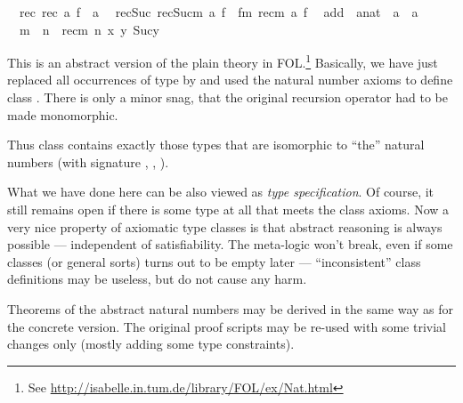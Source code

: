 \begin{isabellebody}
\ \ rec{\isacharunderscore}{}{\isacharcolon}\ {\isachardoublequoteopen}rec{\isacharparenleft}{\isasymzero}{\isacharcomma}\ a{\isacharcomma}\ f{\isacharparenright}\ {\isacharequal}\ a{\isachardoublequoteclose}\isanewline
\ \ rec{\isacharunderscore}Suc{\isacharcolon}\ {\isachardoublequoteopen}rec{\isacharparenleft}Suc{\isacharparenleft}m{\isacharparenright}{\isacharcomma}\ a{\isacharcomma}\ f{\isacharparenright}\ {\isacharequal}\ f{\isacharparenleft}m{\isacharcomma}\ rec{\isacharparenleft}m{\isacharcomma}\ a{\isacharcomma}\ f{\isacharparenright}{\isacharparenright}{\isachardoublequoteclose}\isanewline
\isanewline
{}\isamarkupfalse%
\isanewline
\ \ add\ {\isacharcolon}{\isacharcolon}\ {\isachardoublequoteopen}{\isacharprime}a{\isacharcolon}{\isacharcolon}nat\ {\isasymRightarrow}\ {\isacharprime}a\ {\isasymRightarrow}\ {\isacharprime}a{\isachardoublequoteclose}\ \ \ \ {\isacharparenleft}\ {\isachardoublequoteopen}{\isacharplus}{\isachardoublequoteclose}\ {}{}{\isacharparenright}\isanewline
\ \ {\isachardoublequoteopen}m\ {\isacharplus}\ n\ {\isasymequiv}\ rec{\isacharparenleft}m{\isacharcomma}\ n{\isacharcomma}\ {\isasymlambda}x\ y{\isachardot}\ Suc{\isacharparenleft}y{\isacharparenright}{\isacharparenright}{\isachardoublequoteclose}%
\begin{isamarkuptext}%
This is an abstract version of the plain  theory in
 FOL.\footnote{See
 \url{http://isabelle.in.tum.de/library/FOL/ex/Nat.html}} Basically,
 we have just replaced all occurrences of type  by  and used the natural number axioms to define class .
 There is only a minor snag, that the original recursion operator
  had to be made monomorphic.

 Thus class  contains exactly those types \isa{{\isasymtau}} that
 are isomorphic to ``the'' natural numbers (with signature \isa{{\isasymzero}}, , ).

 \medskip What we have done here can be also viewed as \emph{type
 specification}.  Of course, it still remains open if there is some
 type at all that meets the class axioms.  Now a very nice property of
 axiomatic type classes is that abstract reasoning is always possible
 --- independent of satisfiability.  The meta-logic won't break, even
 if some classes (or general sorts) turns out to be empty later ---
 ``inconsistent'' class definitions may be useless, but do not cause
 any harm.

 Theorems of the abstract natural numbers may be derived in the same
 way as for the concrete version.  The original proof scripts may be
 re-used with some trivial changes only (mostly adding some type
 constraints).%
\end{isamarkuptext}%
\isamarkuptrue%
%
\isadelimtheory
%
\endisadelimtheory
%
\isatagtheory
{}\isamarkupfalse%
%
\endisatagtheory
{\isafoldtheory}%
%
\isadelimtheory
%
\endisadelimtheory
\end{isabellebody}%
